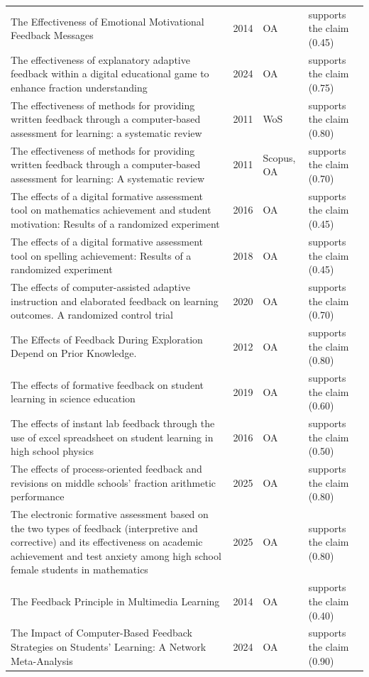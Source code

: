 \begin{longtable}{@{}%
  >{\raggedright\arraybackslash}p{}c%
  >{\raggedright\arraybackslash}p{}%
  >{\raggedright\arraybackslash}p{}@{}}
The Effectiveness of Emotional Motivational Feedback Messages & 2014 & OA & supports the claim (0.45) \\
The effectiveness of explanatory adaptive feedback within a digital educational game to enhance fraction understanding & 2024 & OA & supports the claim (0.75) \\
The effectiveness of methods for providing written feedback through a computer-based assessment for learning: a systematic review & 2011 & WoS & supports the claim (0.80) \\
The effectiveness of methods for providing written feedback through a computer-based assessment for learning: A systematic review & 2011 & Scopus, OA & supports the claim (0.70) \\
The effects of a digital formative assessment tool on mathematics achievement and student motivation: Results of a randomized experiment & 2016 & OA & supports the claim (0.45) \\
The effects of a digital formative assessment tool on spelling achievement: Results of a randomized experiment & 2018 & OA & supports the claim (0.45) \\
The effects of computer-assisted adaptive instruction and elaborated feedback on learning outcomes. A randomized control trial & 2020 & OA & supports the claim (0.70) \\
The Effects of Feedback During Exploration Depend on Prior Knowledge. & 2012 & OA & supports the claim (0.80) \\
The effects of formative feedback on student learning in science education & 2019 & OA & supports the claim (0.60) \\
The effects of instant lab feedback through the use of excel spreadsheet on student learning in high school physics & 2016 & OA & supports the claim (0.50) \\
The effects of process-oriented feedback and revisions on middle schools' fraction arithmetic performance & 2025 & OA & supports the claim (0.80) \\
The electronic formative assessment based on the two types of feedback (interpretive and corrective) and its effectiveness on academic achievement and test anxiety among high school female students in mathematics & 2025 & OA & supports the claim (0.80) \\
The Feedback Principle in Multimedia Learning & 2014 & OA & supports the claim (0.40) \\
The Impact of Computer-Based Feedback Strategies on Students' Learning: A Network Meta-Analysis & 2024 & OA & supports the claim (0.90) \\

\end{longtable}
